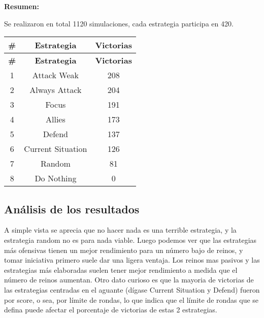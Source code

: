 \documentclass[11pt]{article}
\begin{document}
            \newpage

            \textbf{Resumen:} \vspace{5mm}

            \noindent Se realizaron en total 1120 simulaciones, cada estrategia participa en 420.

            \begin{longtable}{|c|c|c|}
                \hline \textbf{\#}  & \textbf{Estrategia}  & \textbf{Victorias} \\ 
                \endfirsthead
                \hline \textbf{\#}  & \textbf{Estrategia}  & \textbf{Victorias} \\  
                \endhead
                \hline    1   &    Attack Weak    &    208    \\
                \hline    2   &   Always Attack   &    204    \\
                \hline    3   &       Focus       &    191    \\
                \hline    4   &      Allies       &    173    \\
                \hline    5   &      Defend       &    137    \\
                \hline    6   & Current Situation &    126    \\
                \hline    7   &      Random       &    81     \\
                \hline    8   &    Do Nothing     &     0     \\
                \hline
            \end{longtable}

            \subsection{Análisis de los resultados}
            A simple vista se aprecia que no hacer nada es una terrible estrategia, y la estrategia random 
            no es para nada viable. Luego podemos ver que las estrategias más ofensivas tienen un mejor 
            rendimiento para un número bajo de reinos, y tomar iniciativa primero suele dar una ligera 
            ventaja. Los reinos mas pasivos y las estrategias más elaboradas suelen tener mejor rendimiento a 
            medida que el número de reinos aumentan. Otro dato curioso es que la mayoria de victorias de las
            estrategias centradas en el aguante (dígase Current Situation y Defend) fueron por score, o sea, por
            límite de rondas, lo que indica que el límite de rondas que se defina puede afectar el porcentaje
            de victorias de estas 2 estrategias.
\end{document}
